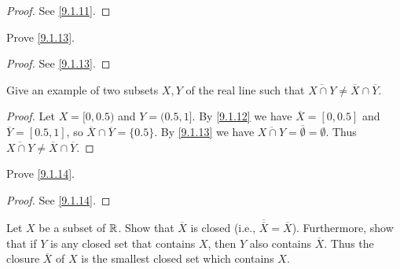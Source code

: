 \begin{proof}
  See \cref{9.1.11}.
\end{proof}

\begin{ex}\label{ex:9.1.3}
  Prove \cref{9.1.13}.
\end{ex}

\begin{proof}
  See \cref{9.1.13}.
\end{proof}

\begin{ex}\label{ex:9.1.4}
  Give an example of two subsets \(X, Y\) of the real line such that \(\overline{X \cap Y} \neq \overline{X} \cap \overline{Y}\).
\end{ex}

\begin{proof}
  Let \(X = [0, 0.5)\) and \(Y = (0.5, 1]\).
  By \cref{9.1.12} we have \(\overline{X} = [0, 0.5]\) and \(\overline{Y} = [0.5, 1]\), so \(\overline{X} \cap \overline{Y} = \{0.5\}\).
  By \cref{9.1.13} we have \(\overline{X \cap Y} = \overline{\emptyset} = \emptyset\).
  Thus \(\overline{X \cap Y} \neq \overline{X} \cap \overline{Y}\).
\end{proof}

\begin{ex}\label{ex:9.1.5}
  Prove \cref{9.1.14}.
\end{ex}

\begin{proof}
  See \cref{9.1.14}.
\end{proof}

\begin{ex}\label{ex:9.1.6}
  Let \(X\) be a subset of \(\mathbb{R}\).
  Show that \(\overline{X}\) is closed (i.e., \(\overline{\overline{X}} = \overline{X}\)).
  Furthermore, show that if \(Y\) is any closed set that contains \(X\), then \(Y\) also contains \(\overline{X}\).
  Thus the closure \(\overline{X}\) of \(X\) is the smallest closed set which contains \(X\).
\end{ex}

